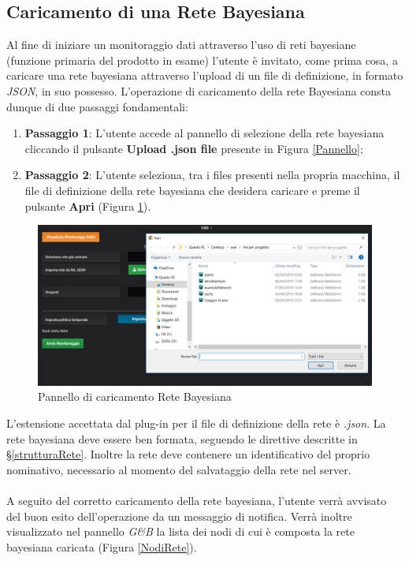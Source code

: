 \subsection{Caricamento di una Rete Bayesiana}\label{ReteB}

Al fine di iniziare un monitoraggio dati attraverso l'uso di reti bayesiane (funzione primaria del prodotto in esame) l'utente è invitato, come prima cosa, a caricare una rete bayesiana attraverso l'upload di un file di definizione, in formato \textit{JSON}\glossario, in suo possesso. L'operazione di caricamento della rete Bayesiana consta dunque di due passaggi fondamentali:
\begin{enumerate}
	\item \textbf{Passaggio 1}: L'utente accede al pannello di selezione della rete bayesiana cliccando il pulsante \textbf{Upload .json file} presente in Figura \ref{Pannello};
	\item \textbf{Passaggio 2}: L'utente seleziona, tra i files presenti nella propria macchina, il file di definizione della rete bayesiana che desidera caricare e preme il pulsante \textbf{Apri} (Figura \ref{UploadRete}).
\end{enumerate} 

\begin{figure}[H]
	\begin{center}
		\includegraphics[scale=0.5]{./images/UpRete.png}
		 \caption{Pannello di caricamento Rete Bayesiana}	
		 \label{UploadRete}
	\end{center}
\end{figure}

L'estensione accettata dal plug-in per il file di definizione della rete è \textit{.json}. La rete bayesiana deve essere ben formata, seguendo le direttive descritte in §\ref{strutturaRete}. Inoltre la rete deve contenere un identificativo del proprio nominativo, necessario al momento del salvataggio della rete nel server.\\
~\\
A seguito del corretto caricamento della rete bayesiana, l'utente verrà avvisato del buon esito dell'operazione da un messaggio di notifica. Verrà inoltre visualizzato nel pannello \textit{G\&B} la lista dei nodi di cui è composta la rete bayesiana caricata (Figura \ref{NodiRete}).

